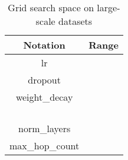 \documentclass[nohyperref]{article}
\theoremstyle{plain}
\theoremstyle{definition}
\theoremstyle{remark}
\begin{document}
\begin{table}[!htbp]
\caption{Grid search space on large-scale datasets}
\centering
\begin{tabular}{|c|c|}
    \hline
    {\bf Notation} & {\bf Range} \\ \hline
     lr  &  \\ \hline 
      dropout &  \\ \hline 
        weight\_decay  &  \\ \hline 
           &  \\ \hline 
           &  \\ \hline 
           &  \\ \hline  
            &  \\ \hline 
            norm\_layers  &  \\ \hline 
             max\_hop\_count   &  \\ \hline   
\end{tabular}
\label{table:grid_search_large}
\end{table}






 
\end{document}
